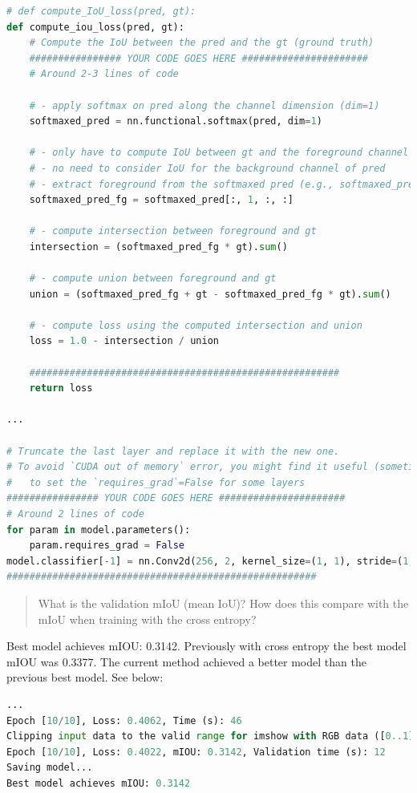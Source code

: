 \documentclass{article}
\begin{document}
\begin{lstlisting}[language=Python]
# def compute_IoU_loss(pred, gt):
def compute_iou_loss(pred, gt):
    # Compute the IoU between the pred and the gt (ground truth)
    ################ YOUR CODE GOES HERE ######################
    # Around 2-3 lines of code

    # - apply softmax on pred along the channel dimension (dim=1)
    softmaxed_pred = nn.functional.softmax(pred, dim=1)

    # - only have to compute IoU between gt and the foreground channel of pred
    # - no need to consider IoU for the background channel of pred
    # - extract foreground from the softmaxed pred (e.g., softmaxed_pred[:, 1, :, :])
    softmaxed_pred_fg = softmaxed_pred[:, 1, :, :]

    # - compute intersection between foreground and gt
    intersection = (softmaxed_pred_fg * gt).sum()

    # - compute union between foreground and gt
    union = (softmaxed_pred_fg + gt - softmaxed_pred_fg * gt).sum()

    # - compute loss using the computed intersection and union
    loss = 1.0 - intersection / union

    ######################################################
    return loss

...

# Truncate the last layer and replace it with the new one.
# To avoid `CUDA out of memory` error, you might find it useful (sometimes required)
#   to set the `requires_grad`=False for some layers
################ YOUR CODE GOES HERE ######################
# Around 2 lines of code
for param in model.parameters():
    param.requires_grad = False
model.classifier[-1] = nn.Conv2d(256, 2, kernel_size=(1, 1), stride=(1, 1))
######################################################
\end{lstlisting}

\begin{quote}
What is the validation mIoU (mean IoU)? How does this compare with the mIoU when training with the cross entropy?
\end{quote}

Best model achieves mIOU: 0.3142. Previously with cross entropy the best model mIOU was 0.3377. The current method achieved a better model than the previous best model. See below:

\begin{lstlisting}[language=Python]
...
Epoch [10/10], Loss: 0.4062, Time (s): 46
Clipping input data to the valid range for imshow with RGB data ([0..1] for floats or [0..255] for integers).
Epoch [10/10], Loss: 0.4022, mIOU: 0.3142, Validation time (s): 12
Saving model...
Best model achieves mIOU: 0.3142
\end{lstlisting}
\end{document}
